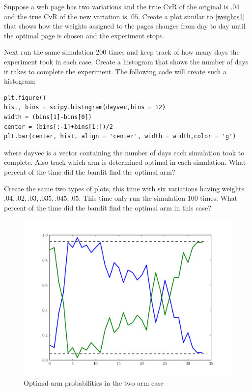 \begin{problem}
Suppose a web page has two variations and the true CvR of the original is $.04$ and the true CvR of the new variation is $.05$.  Create a plot similar to \ref{weights1} that shows how the weights assigned to the pages changes from day to day until the optimal page is chosen and the experiment stops.

Next run the same simulation 200 times and keep track of how many days the experiment took in each case.  Create a histogram that shows the number of days it takes to complete the experiment.  The following code will create such a histogram:

\begin{lstlisting}[style = python]
plt.figure()
hist, bins = scipy.histogram(dayvec,bins = 12)
width = (bins[1]-bins[0])
center = (bins[:-1]+bins[1:])/2
plt.bar(center, hist, align = 'center', width = width,color = 'g')
\end{lstlisting}
where dayvec is a vector containing the number of days each simulation took to complete.  Also track which arm is determined optimal in each simulation.  What percent of the time did the bandit find the optimal arm?

Create the same two types of plots, this time with six variations having weights $.04,.02,.03,.035,.045,.05$.  This time only run the simulation 100 times.  What percent of the time did the bandit find the optimal arm in this case?
\end{problem}

\begin{figure}\label{fig:weights1}
\begin{center}
        \includegraphics[scale=0.4]{./Applications/MarkDecProc/weights1.pdf}
        \caption{Optimal arm probabilities in the two arm case}
\end{center}
\end{figure}

